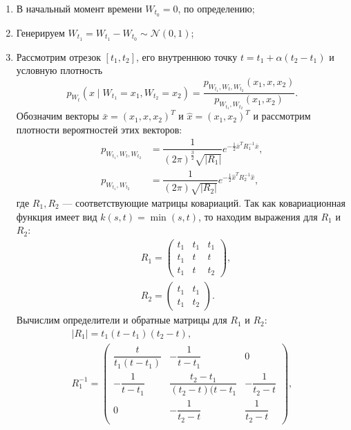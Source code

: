 \begin{enumerate}
	\item В начальный момент времени $W_{t_0}=0$, по определению;
	\item Генерируем $W_{t_1}=W_{t_1}-W_{t_0}\sim\mathcal{N}(0,1)$;
	\item Рассмотрим отрезок $[t_1,t_2]$, его внутреннюю точку $t = t_1 + 
     \alpha(t_2 - t_1)$ и условную плотность
	\begin{equation}\label{dens}
	    p_{W_t}(x \mid W_{t_1} = x_1, W_{t_2} = x_2) = \dfrac{p_{W_{t_1}, 
         W_t, W_{t_2}}(x_1, x, x_2)}{p_{W_{t_1}, W_{t_2}}(x_1, x_2)}. 
	\end{equation}
	 Обозначим векторы $ \bar{x} = (x_1, x, x_2)^T $ и $ \hat{x} = (x_1, 
     x_2)^T $ и рассмотрим плотности вероятностей этих векторов:
	$$
	\begin{aligned}
	    p_{W_{t_1}, W_t, W_{t_2}} & = \dfrac{1}{(2 \pi)^{\frac{3}{2}} 
         \sqrt{|R_1|}} e^{-\frac{1}{2} \bar{x}^T R_1^{-1} \bar{x}},\\
	    p_{W_{t_1}, W_{t_2}} &= \dfrac{1}{(2 \pi) \sqrt{|R_2|}} 
         e^{-\frac{1}{2}\hat{x}^T R_2^{-1} \hat{x}},
	\end{aligned}
	$$
	где $R_1,R_2$ --- соответствующие матрицы ковариаций. Так как 
     ковариационная функция имеет вид $k(s,t) = \min(s,t)$, то находим 
     выражения для $R_1$ и $R_2$:
	$$
	\begin{aligned}
	    & R_1 = \begin{pmatrix}
	        t_1 & t_1 & t_1 \\
	        t_1 & t & t \\
	        t_1 & t & t_2
	    \end{pmatrix} ,\\
	    & R_2 = \begin{pmatrix}
	        t_1 & t_1 \\
	        t_1 & t_2
	    \end{pmatrix}.
	\end{aligned}
	$$
	Вычислим определители и обратные матрицы для $R_1$ и $R_2$:
	\begin{gather*}
	|R_1|=t_1(t-t_1)(t_2-t), \\
	R_1^{-1}=\begin{pmatrix}
	\dfrac{t}{t_1(t-t_1)} & -\dfrac{1}{t-t_1} & 0 \\
	-\dfrac{1}{t-t_1} & \dfrac{t_2-t_1}{(t_2-t)(t-t_1} & -\dfrac{1}{t_2-t} \\
	0 & -\dfrac{1}{t_2-t} & \dfrac{1}{t_2-t}
	\end{pmatrix}, \\

\end{gather*}
\end{enumerate}
